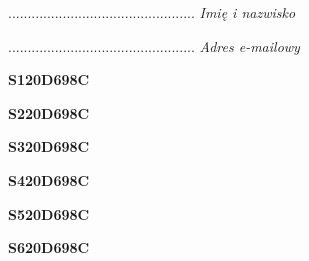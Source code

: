 \begin{turn}{90}\begin{minipage}{\linewidth} \vspace{20mm} ................................................  \textit{Imię i nazwisko}\end{minipage}\end{turn}

\begin{turn}{90}\begin{minipage}{\linewidth} \vspace{20mm} ................................................  \textit{Adres e-mailowy}\end{minipage}\end{turn}

\begin{turn}{90}\huge \begin{minipage}{\linewidth} \vspace{10mm}\textbf{S120D698C}\end{minipage}\end{turn}

\begin{turn}{90}\huge \begin{minipage}{\linewidth} \vspace{10mm}\textbf{S220D698C}\end{minipage}\end{turn}

\begin{turn}{90}\huge \begin{minipage}{\linewidth} \vspace{10mm}\textbf{S320D698C}\end{minipage}\end{turn}

\begin{turn}{90}\huge \begin{minipage}{\linewidth} \vspace{10mm}\textbf{S420D698C}\end{minipage}\end{turn}

\begin{turn}{90}\huge \begin{minipage}{\linewidth} \vspace{10mm}\textbf{S520D698C}\end{minipage}\end{turn}

\begin{turn}{90}\huge \begin{minipage}{\linewidth} \vspace{10mm}\textbf{S620D698C}\end{minipage}\end{turn}

